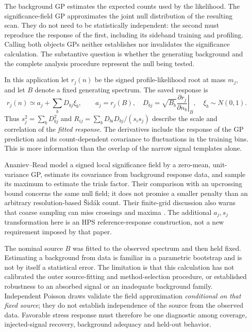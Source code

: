 The background GP estimates the expected counts used by the likelihood. The
significance-field GP approximates the joint null distribution of the resulting
scan. They do not need to be statistically independent: the second must reproduce
the response of the first, including its sideband training and profiling. Calling
both objects GPs neither establishes nor invalidates the significance calculation.
The substantive question is whether the generating background and the complete
analysis procedure represent the null being tested.

In this application let $r_j(n)$ be the signed profile-likelihood root at mass
$m_j$, and let $B$ denote a fixed generating spectrum. The saved response is
\begin{equation}
 r_j(n)\simeq a_j+\sum_b D_{bj}\xi_b,\qquad
 a_j=r_j(B),\quad
 D_{bj}=\sqrt{B_b}\left.\frac{\partial r_j}{\partial n_b}\right|_B,
 \quad \xi_b\sim N(0,1).
\end{equation}
Thus $s_j^2=\sum_b D_{bj}^2$ and
$R_{ij}=\sum_bD_{bi}D_{bj}/(s_i s_j)$ describe the scale and correlation of the
\emph{fitted response}. The derivatives include the response of the GP prediction
and its count-dependent covariance to fluctuations in the training bins. This is
more information than the overlap of the narrow signal templates alone.

Ananiev--Read model a signed local significance field by a zero-mean,
unit-variance GP, estimate its covariance from background response data, and
sample its maximum to estimate the trials factor. Their comparison with an
upcrossing bound concerns the same null field; it does not promise a smaller
penalty than an arbitrary resolution-based \v{S}id\'ak count. Their finite-grid
discussion also warns that coarse sampling can miss crossings and maxima
\cite{AnanievRead}. The additional $a_j,s_j$ transformation here is an HPS
reference-response construction, not a new requirement imposed by that paper.

The nominal source $B$ was fitted to the observed spectrum and then held fixed.
Estimating a background from data is familiar in a parametric bootstrap and is
not by itself a statistical error. The limitation is that this calculation has
not calibrated the outer source-fitting and method-selection procedure, or
established robustness to an absorbed signal or an inadequate background family.
Independent Poisson draws validate the field approximation \emph{conditional on
that fixed source}; they do not establish independence of the source from the
observed data. Favorable stress response must therefore be one diagnostic among
coverage, injected-signal recovery, background adequacy and held-out behavior.

